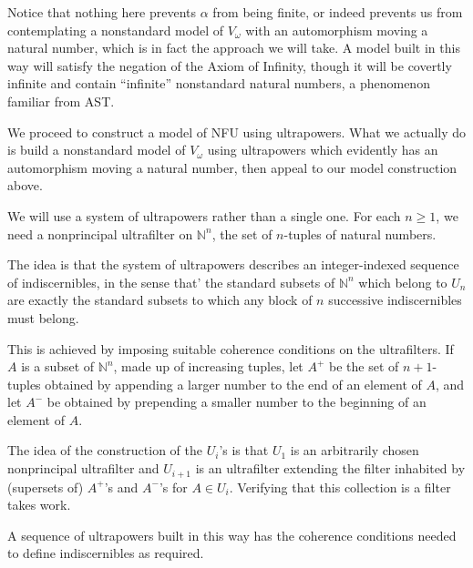 \documentclass{slides}
\begin{document}
\begin{slide}

Notice that nothing here prevents $\alpha$ from being finite, or indeed prevents us from contemplating a nonstandard model of $V_\omega$ with an automorphism moving a natural number, which is in fact the approach we will take.  A model built in this way will satisfy the negation of the Axiom of Infinity, though it will be covertly infinite and contain ``infinite'' nonstandard natural numbers, a phenomenon familiar from AST.

\end{slide}

\begin{slide}

We proceed to construct a model of NFU using ultrapowers.  What we actually do is build a nonstandard model of $V_\omega$ using ultrapowers which evidently has an automorphism moving a natural number, then appeal to our model construction above.

We will use a system of ultrapowers rather than a single one.  For each $n\geq 1$, we need a nonprincipal ultrafilter
on $\mathbb N^n$, the set of $n$-tuples of natural numbers.

The idea is that the system of ultrapowers describes an integer-indexed sequence of indiscernibles, in the sense that'
the standard subsets of $\mathbb N^n$ which belong to $U_n$ are exactly the standard subsets to which any block of $n$ successive indiscernibles must belong.
\end{slide}

\begin{slide}

This is achieved by imposing suitable coherence conditions on the ultrafilters.  If $A$ is a subset of $\mathbb N^n$, made up of increasing tuples, let $A^+$ be
the set of $n+1$-tuples obtained by appending a larger number to the end of an element of $A$, and let $A^-$ be obtained by
prepending a smaller number to the beginning of an element of $A$.

The idea of the construction of the $U_i$'s is that $U_1$ is an arbitrarily chosen nonprincipal ultrafilter and $U_{i+1}$ is an ultrafilter extending the filter inhabited by (supersets of) $A^+$'s and $A^-$'s for $A \in U_i$.  Verifying that this collection is a filter takes work.

A sequence of ultrapowers built in this way has the coherence conditions needed to define indiscernibles as required.

\end{slide}
\end{document}
